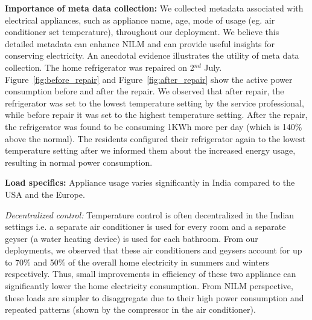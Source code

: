 \documentclass[10pt]{sensys-proc}
\newcommand{\redcolor}[1]{\textcolor{red}{#1}}
\newcommand{\figref}[1]{Figure~\ref{#1}}
\begin{document}
\noindent \textbf{Importance of meta data collection:} We collected metadata associated with electrical appliances, such as appliance name, age, mode of usage (eg. air conditioner set temperature), throughout our deployment. We believe this detailed metadata can enhance NILM and can provide useful insights for conserving electricity. An anecdotal evidence illustrates the utility of meta data collection. The home refrigerator was repaired on 2$^{nd}$ July. \figref{fig:before_repair} and \figref{fig:after_repair} show the active power consumption before and after the repair. We observed that after repair, the refrigerator was set to the lowest temperature setting by the service professional, while before repair it was set to the highest temperature setting. After the repair, the refrigerator was found to be consuming 1KWh more per day (which is 140\% above the normal). The residents configured their refrigerator again to the lowest temperature setting after we informed them about the increased energy usage, resulting in normal power consumption. %
%

\noindent \textbf{Load specifics:} Appliance usage varies significantly in India compared to the USA and the Europe. 

\emph{Decentralized control:} Temperature control is often decentralized in the Indian settings i.e. a separate air conditioner is used for every room and a separate geyser (a water heating device) is used for each bathroom. From our deployments, we observed that these air conditioners and geysers account for up to 70\% and 50\% of the overall home electricity in summers and winters respectively. Thus, small improvements in efficiency of these two appliance can significantly lower the home electricity consumption. From NILM perspective, these loads are simpler to disaggregate due to their high power consumption and repeated patterns (shown by the compressor in the air conditioner). 
\end{document}
